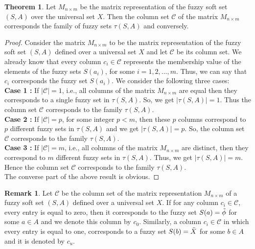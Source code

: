 \documentclass{article}
\theoremstyle{definition}
\newtheorem{theorem}{Theorem}[section]
\newtheorem{remark}{Remark}[section]
\begin{document}
\begin{theorem}

Let $M_{n\times m}$ be the matrix representation of the fuzzy soft set $(S,A)$ over the universal set $X$. Then the column set $\mathcal{C}$ of the matrix $M_{n\times m}$ corresponds the family of fuzzy sets $\tau (S,A)$ and conversely.

\end{theorem}
\begin{proof}

 Consider the matrix $M_{n\times m}$ to be the matrix representation of the fuzzy soft set $(S,A)$ defined over a universal set $X$ and let $\mathcal{C}$ be its column set. We already know that every column $c_i\in \mathcal{C}$ represents the membership value of the elements of the fuzzy sets $S(a_i)$, for some $i=1, 2,\dots, m$. Thus, we can say that $c_i$ corresponds the fuzzy set $S(a_i)$. We consider the following three cases:\\

\textbf{Case 1 :}
 If $|\mathcal{C}|=1$, i.e., all columns of the matrix $M_{n\times m}$ are equal then they corresponds to a single fuzzy set in $\tau(S,A)$. So, we get $|\tau(S,A)|=1$. Thus the column set $\mathcal{C}$ corresponds to the family $\tau(S,A)$.\\

 \textbf{Case 2 :}
If $|\mathcal{C}|=p$, for some integer $p<m$, then these $p$ columns correspond to $p$ different fuzzy sets in $\tau(S,A)$ and we get $|\tau(S,A)|=p$. So, the column set $\mathcal{C}$ corresponds to the family $\tau(S,A)$. \\

 
 \textbf{Case 3 :}
 If $|\mathcal{C}|=m$, i.e., all columns of the matrix $M_{n\times m}$ are distinct, then they correspond to $m$ different fuzzy sets in $\tau(S,A)$. Thus, we get $|\tau(S,A)|=m$. Hence the column set $\mathcal{C}$ corresponds to the family $\tau(S,A)$.\\

 The converse part of the above result is obvious.
    
\end{proof}

\begin{remark}
    Let $\mathcal{C}$ be the column set of the matrix representation $M_{n\times m}$ of a fuzzy soft set $(S,A)$ defined over a universal set $X$. If for any column $c_i \in \mathcal{C}$, every entry is equal to zero, then it corresponds to the fuzzy set $S(a)=\Tilde{\phi}$ for some $a\in A$ and we denote this column by $c_0$. Similarly, a column $c_i \in \mathcal{C}$ in which every entry is equal to one, corresponds to a fuzzy set $S(b)=\Tilde{X}$ for some $b\in A$ and it is denoted by $c_u$.
\end{remark}
\end{document}
